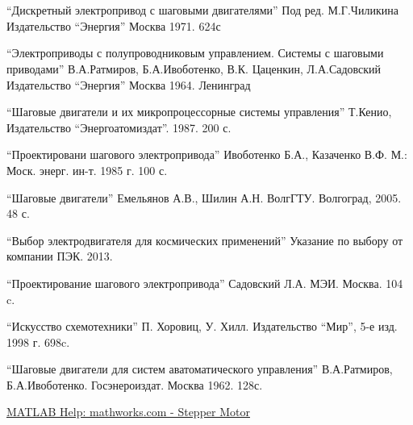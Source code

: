 \newpage
\section[Список использованной литературы]{}
\begin{thebibliography}{30}

     ``Дискретный электропривод с шаговыми двигателями'' Под ред. М.Г.Чиликина
                        Издательство ``Энергия'' Москва 1971. 624с

     ``Электроприводы с полупроводниковым управлением. Системы с шаговыми приводами''
                                    В.А.Ратмиров, Б.А.Ивоботенко, В.К. Цаценкин, Л.А.Садовский
                                    Издательство ``Энергия'' Москва 1964. Ленинград

     ``Шаговые двигатели и их микропроцессорные системы управления'' Т.Кенио,
                    Издательство ``Энергоатомиздат''. 1987. 200 с.

     ``Проектировани шагового электропривода''
                                    Ивоботенко Б.А., Казаченко В.Ф. М.:
                                    Моск. энерг. ин-т. 1985 г. 100 с.

     ``Шаговые двигатели''
                                Емельянов А.В., Шилин А.Н.
                                ВолгГТУ. Волгоград, 2005. 48 с.

     ``Выбор электродвигателя для космических применений''
                                        Указание по выбору от компании ПЭК. 2013.

     ``Проектирование шагового электропривода''
                        Садовский Л.А. МЭИ. Москва. 104 c.

     ``Искусство схемотехники''
                            П. Хоровиц, У. Хилл.
                            Издательство ``Мир'', 5-е изд. 1998 г. 698c.

     ``Шаговые двигатели для систем аватоматического управления''
                                                В.А.Ратмиров, Б.А.Ивоботенко.
                                                Госэнероиздат. Москва 1962. 128с.

     \href{http://www.mathworks.com/help/physmod/sps/powersys/ref/steppermotor.html}
                                            {MATLAB Help: mathworks.com - Stepper Motor}


\end{thebibliography}
